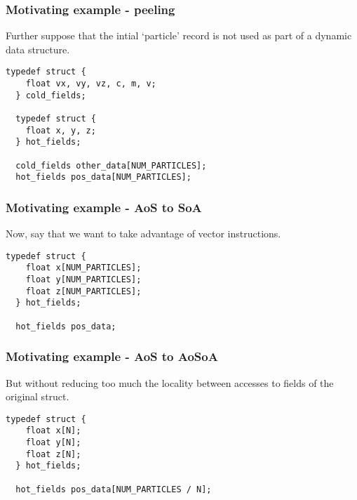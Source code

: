 \begin{frame}[fragile]
\frametitle{Motivating example - peeling}

Further suppose that the intial `particle' record is not used as part of a dynamic data structure.

\begin{lstlisting}[style=Cstyle]
  typedef struct {
    float vx, vy, vz, c, m, v;
  } cold_fields;

  typedef struct {
    float x, y, z;
  } hot_fields;

  cold_fields other_data[NUM_PARTICLES];
  hot_fields pos_data[NUM_PARTICLES];
\end{lstlisting}

\end{frame}


\begin{frame}[fragile]
\frametitle{Motivating example - AoS to SoA}

Now, say that we want to take advantage of vector instructions.

\bigskip

\begin{lstlisting}[style=Cstyle]
  typedef struct {
    float x[NUM_PARTICLES]; 
    float y[NUM_PARTICLES];
    float z[NUM_PARTICLES];
  } hot_fields;

  hot_fields pos_data;
\end{lstlisting}

\end{frame}


\begin{frame}[fragile]
\frametitle{Motivating example - AoS to AoSoA}

But without reducing too much the locality between accesses to fields of the original struct.

\bigskip

\begin{lstlisting}[style=Cstyle]
  typedef struct {
    float x[N]; 
    float y[N];
    float z[N];
  } hot_fields;

  hot_fields pos_data[NUM_PARTICLES / N];
\end{lstlisting}

\end{frame}


